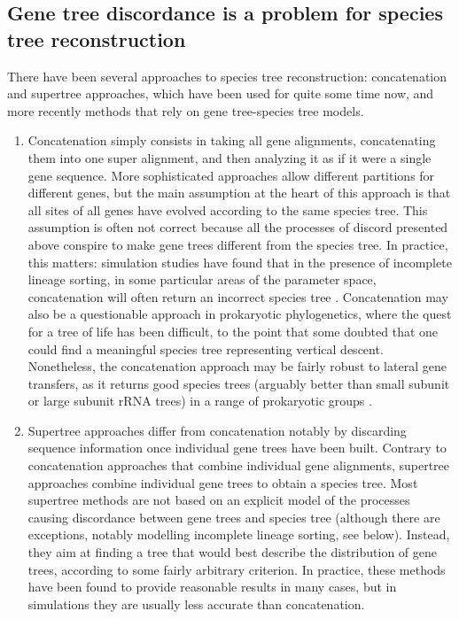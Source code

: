 \subsection{Gene tree discordance is a problem for species tree reconstruction}
There have been several approaches to species tree reconstruction: concatenation and supertree approaches, which have been used for quite some time now, and more recently methods that rely on gene tree-species tree models.\begin{enumerate}
\item Concatenation simply consists in taking all gene alignments, concatenating them into one super alignment, and then analyzing it as if it were a single gene sequence.
More sophisticated approaches allow different partitions for different genes, but the main assumption at the heart of this approach is that all sites of all genes have evolved according to the same species tree.
This assumption is often not correct because all the processes of discord presented above conspire to make gene trees different from the species tree.
In practice, this matters: simulation studies have found that in the presence of incomplete lineage sorting, in some particular areas of the parameter space, concatenation will often return an incorrect species tree \citep{Leache2011}.
Concatenation may also be a questionable approach in prokaryotic phylogenetics, where the quest for a tree of life has been difficult, to the point that some doubted that one could find a meaningful species tree representing vertical descent.
Nonetheless, the concatenation approach may be fairly robust to lateral gene transfers, as it returns good species trees (arguably better than small subunit or large subunit rRNA trees) in a range of prokaryotic groups \citep{Abby2012}.
\item Supertree approaches differ from concatenation notably by discarding sequence information once individual gene trees have been built.
Contrary to concatenation approaches that combine individual gene alignments, supertree approaches combine individual gene trees to obtain a species tree.
Most supertree methods are not based on an explicit model of the processes causing discordance between gene trees and species tree (although there are exceptions, notably modelling incomplete lineage sorting, see below).
Instead, they aim at finding a tree that would best describe the distribution of gene trees, according to some fairly arbitrary criterion.
In practice, these methods have been found to provide reasonable results in many cases, but in simulations they are usually less accurate than concatenation.

\end{enumerate}
